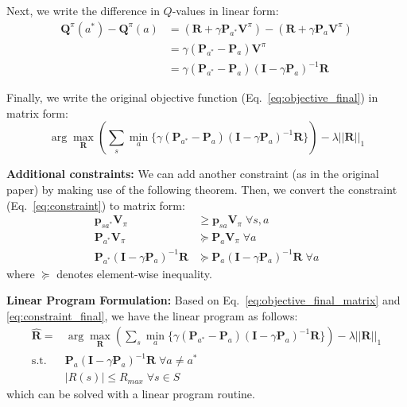 \documentclass[11pt]{article}
\begin{document}
Next, we write the difference in $Q$-values in linear form:
\begin{align}
    \mathbf{Q}^\pi(a^*) - \mathbf{Q}^\pi(a) &= (\mathbf{R}+\gamma\mathbf{P}_{a^*}\mathbf{V}^\pi) - (\mathbf{R}+\gamma\mathbf{P}_a\mathbf{V}^\pi) \\
    &=\gamma(\mathbf{P}_{a^*}-\mathbf{P}_a)\mathbf{V}^\pi \\
    &=\gamma(\mathbf{P}_{a^*}-\mathbf{P}_a)(\mathbf{I}-\gamma\mathbf{P}_a)^{-1}\mathbf{R}
\end{align}

Finally, we write the original objective function (Eq.~\ref{eq:objective_final}) in matrix form:
\begin{equation}\label{eq:objective_final_matrix}
    \arg\max_\mathbf{R}(\sum_s\min_a\{\gamma(\mathbf{P}_{a^*}-\mathbf{P}_a)(\mathbf{I}-\gamma\mathbf{P}_a)^{-1}\mathbf{R}\})-\lambda||\mathbf{R}||_1
\end{equation}

\textbf{Additional constraints: } We can add another constraint (as in the original paper) by making use of the following theorem. 
\label{theorem:1}
Then, we convert the constraint (Eq.~\ref{eq:constraint}) to matrix form:
\begin{align}
    \mathbf{p}_{sa^*}\mathbf{V}_\pi &\geq \mathbf{p}_{sa}\mathbf{V}_\pi \;\forall s,a\\
    \mathbf{P}_{a^*}\mathbf{V}_\pi &\succeq \mathbf{P}_{a}\mathbf{V}_\pi \;\forall a \\
    \mathbf{P}_{a^*}(\mathbf{I}-\gamma\mathbf{P}_a)^{-1}\mathbf{R} &\succeq \mathbf{P}_{a}(\mathbf{I}-\gamma\mathbf{P}_a)^{-1}\mathbf{R} \;\forall a \label{eq:constraint_final}
\end{align}
where $\succeq$ denotes element-wise inequality.

\textbf{Linear Program Formulation:}
Based on Eq.~\ref{eq:objective_final_matrix} and \ref{eq:constraint_final}, we have the linear program as follows:
\begin{align}
    \hat{\mathbf{R}} = &\arg\max_\mathbf{R}(\sum_s\min_a\{\gamma(\mathbf{P}_{a^*}-\mathbf{P}_a)(\mathbf{I}-\gamma\mathbf{P}_a)^{-1}\mathbf{R}\})-\lambda||\mathbf{R}||_1 \\
    \text{s.t.} &\mathbf{P}_{a}(\mathbf{I}-\gamma\mathbf{P}_a)^{-1}\mathbf{R} \;\forall a\neq a^*\\
    &|R(s)|\leq R_{max} \;\forall s\in S
\end{align}
which can be solved with a linear program routine.
\end{document}
